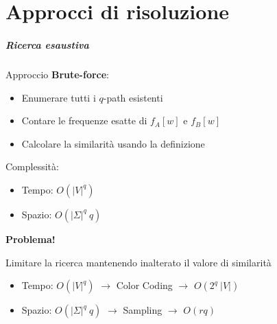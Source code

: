 \part{Approcci di risoluzione}

\begin{frame}
	\partpage
	\centering
\end{frame}

\begin{frame}
	\frametitle{Ricerca esaustiva}
	
	Approccio \textbf{Brute-force}:
	\begin{itemize}
		\item Enumerare tutti i $q$-path esistenti
		\item Contare le frequenze esatte di $f_A[w]$ e $f_B[w]$
		\item Calcolare la similarità usando la definizione
	\end{itemize}

	\medskip
	
	Complessità:
	\begin{itemize}
		\item Tempo: $O(|V|^q)$
		\item Spazio: $O(|\Sigma|^q\ q)$
	\end{itemize}

	\centering
	\medskip
	\textbf{Problema!}
	
	Limitare la ricerca mantenendo inalterato il valore di similarità
	
	\begin{itemize}
		\item Tempo: $O(|V|^q)$ $\rightarrow$ Color Coding $\rightarrow$ $O(2^q\ |V|)$
		\item Spazio: $O(|\Sigma|^q\ q)$ $\rightarrow$ Sampling $\rightarrow$ $O(rq)$
	\end{itemize}
	
	
		
\end{frame}

